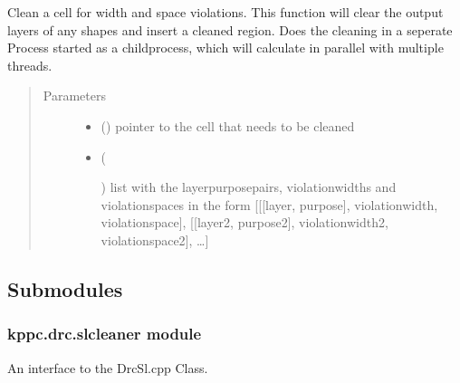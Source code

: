 \documentclass[a4paper,10pt,english]{sphinxmanual}
\begin{document}
\begin{fulllineitems}
\label{\detokenize{drc/drc:kppc.drc.multiprocessing_clean}}
Clean a cell for width and space violations.
This function will clear the output layers of any shapes and insert a cleaned region.
Does the cleaning in a seperate Process started as a childprocess,
which will calculate in parallel with multiple threads.
\begin{quote}\begin{description}
\item[{Parameters}] \leavevmode\begin{itemize}
\item {} 
 () \textendash{} pointer to the cell that needs to be cleaned

\item {} 
 (%
\begin{footnote}[7]\sphinxAtStartFootnote
{}
%
\end{footnote}) \textendash{} list with the layerpurposepairs, violationwidths and violationspaces in the form {[}{[}{[}layer,
purpose{]}, violationwidth, violationspace{]}, {[}{[}layer2, purpose2{]}, violationwidth2, violationspace2{]}, …{]}

\end{itemize}

\end{description}\end{quote}

\end{fulllineitems}



\subsection{Submodules}
\label{\detokenize{drc/drc:submodules}}

\subsubsection{kppc.drc.slcleaner module}
\label{\detokenize{drc/drc:kppc-drc-slcleaner-module}}\label{\detokenize{drc/drc:slcleaner}}
An interface to the DrcSl.cpp Class.
\end{document}
